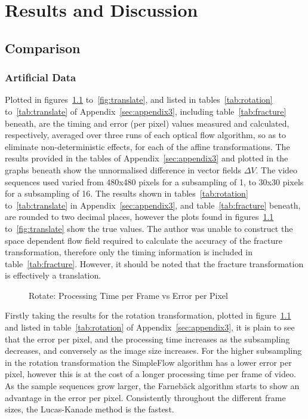 \chapter{Results and Discussion}
\label{sec:results}

\ifpdf
    \graphicspath{{Section4/Figs/Raster/}{Section4/Figs/PDF/}{Section4/Figs/}}
\else
    \graphicspath{{Section4/Figs/Vector/}{Section4/Figs/}}
\fi

\section{Comparison}

\subsection{Artificial Data}

Plotted in figures~\ref{fig:rotate} to~\ref{fig:translate}, and listed in tables~\ref{tab:rotation} to~\ref{tab:translate} of Appendix~\ref{sec:appendix3}, including table~\ref{tab:fracture} beneath, are the timing and error (per pixel) values measured and calculated, respectively, averaged over three runs of each optical flow algorithm, so as to eliminate non-deterministic effects, for each of the affine transformations. The results provided in the tables of Appendix~\ref{sec:appendix3} and plotted in the graphs beneath show the unnormalised difference in vector fields $\Delta V$. The video sequences used varied from 480x480 pixels for a subsampling of 1, to 30x30 pixels for a subsampling of 16. The results shown in tables~\ref{tab:rotation} to~\ref{tab:translate} in Appendix~\ref{sec:appendix3}, and table~\ref{tab:fracture} beneath, are rounded to two decimal places, however the plots found in figures~\ref{fig:rotate} to~\ref{fig:translate} show the true values. The author was unable to construct the space dependent flow field required to calculate the accuracy of the fracture transformation, therefore only the timing information is included in table~\ref{tab:fracture}. However, it should be noted that the fracture transformation is effectively a translation.

\begin{figure}[h]
  \centering
  \caption{Rotate: Processing Time per Frame vs Error per Pixel}
  \label{fig:rotate}
\end{figure}

Firstly taking the results for the rotation transformation, plotted in figure~\ref{fig:rotate} and listed in table~\ref{tab:rotation} of Appendix~\ref{sec:appendix3}, it is plain to see that the error per pixel, and the processing time increases as the subsampling decreases, and conversely as the image size increases. For the higher subsampling in the rotation transformation the SimpleFlow algorithm has a lower error per pixel, however this is at the cost of a longer processing time per frame of video. As the sample sequences grow larger, the Farnebäck algorithm starts to show an advantage in the error per pixel. Consistently throughout the different frame sizes, the Lucas-Kanade method is the fastest.

